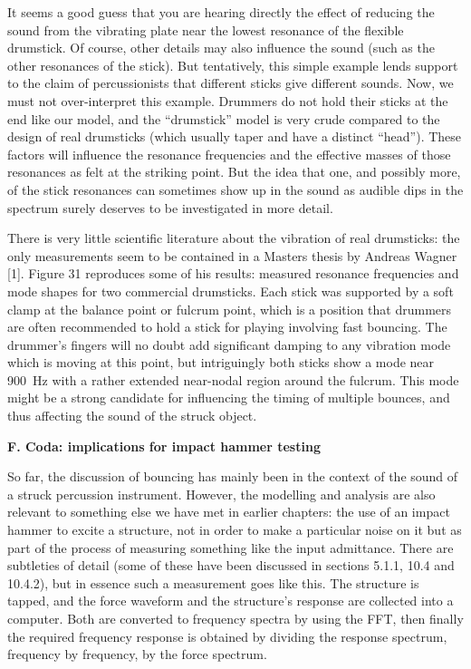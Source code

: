   It seems a good guess that you are hearing directly the effect of reducing 
  the sound from the vibrating plate near the lowest resonance of the flexible 
  drumstick. Of course, other details may also influence the sound (such as the 
  other resonances of the stick). But tentatively, this simple example lends 
  support to the claim of percussionists that different sticks give different 
  sounds. Now, we must not over-interpret this example. Drummers do not hold 
  their sticks at the end like our model, and the “drumstick” model is very 
  crude compared to the design of real drumsticks (which usually taper and have 
  a distinct “head”). These factors will influence the resonance frequencies 
  and the effective masses of those resonances as felt at the striking point. 
  But the idea that one, and possibly more, of the stick resonances can 
  sometimes show up in the sound as audible dips in the spectrum surely 
  deserves to be investigated in more detail. 

  There is very little scientific literature about the vibration of real 
  drumsticks: the only measurements seem to be contained in a Masters thesis by 
  Andreas Wagner [1]. Figure 31 reproduces some of his results: measured 
  resonance frequencies and mode shapes for two commercial drumsticks. Each 
  stick was supported by a soft clamp at the balance point or fulcrum point, 
  which is a position that drummers are often recommended to hold a stick for 
  playing involving fast bouncing. The drummer’s fingers will no doubt add 
  significant damping to any vibration mode which is moving at this point, but 
  intriguingly both sticks show a mode near 900~Hz with a rather extended 
  near-nodal region around the fulcrum. This mode might be a strong candidate 
  for influencing the timing of multiple bounces, and thus affecting the sound 
  of the struck object. 


  \textbf{F. Coda: implications for impact hammer testing} 

  So far, the discussion of bouncing has mainly been in the context of the 
  sound of a struck percussion instrument. However, the modelling and analysis 
  are also relevant to something else we have met in earlier chapters: the use 
  of an impact hammer to excite a structure, not in order to make a particular 
  noise on it but as part of the process of measuring something like the input 
  admittance. There are subtleties of detail (some of these have been discussed 
  in sections 5.1.1, 10.4 and 10.4.2), but in essence such a measurement goes 
  like this. The structure is tapped, and the force waveform and the 
  structure’s response are collected into a computer. Both are converted to 
  frequency spectra by using the FFT, then finally the required frequency 
  response is obtained by dividing the response spectrum, frequency by 
  frequency, by the force spectrum. 

